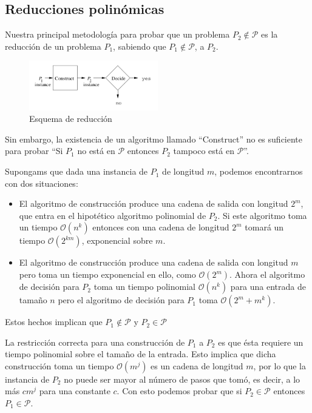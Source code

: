 \documentclass[a4paper]{article}
\begin{document}


\subsection{Reducciones polinómicas}
Nuestra principal metodología para probar que un problema $P_2 \notin \mathcal{P}$
es la reducción de un problema $P_1$, sabiendo que $P_1 \notin \mathcal{P}$, a $P_2$.

\begin{figure}[h]
\centering
\graphicspath{ {./Images/} }
\includegraphics[width=0.5\textwidth]{reduccion.png}
\caption{\label{fig:Reduccion}Esquema de reducción\cite{hopcroft2001introduction}}
\end{figure}
Sin embargo, la existencia de un algoritmo llamado ``Construct'' no es suficiente
para probar ``Si $P_1$ no está en $\mathcal{P}$ entonces $P_2$ tampoco está en $\mathcal{P}$''.

Supongams que dada una instancia de $P_1$ de longitud $m$, podemos encontrarnos
con dos situaciones:
\begin{itemize}
  \item El algoritmo de construcción produce una cadena de salida con longitud
  $2^{m}$, que entra en el hipotético algoritmo polinomial de $P_2$. Si este
  algoritmo toma un tiempo $\mathcal{O}(n^k)$ entonces con una cadena de
  longitud $2^{m}$ tomará un tiempo $\mathcal{O}(2^{km})$, exponencial sobre $m$.
  \item El algoritmo de construcción produce una cadena de salida con longitud
  $m$ pero toma un tiempo exponencial en ello, como $\mathcal{O}(2^m)$. Ahora el
  algoritmo de decisión para $P_2$ toma un tiempo polinomial $\mathcal{O}(n^k)$
  para una entrada de tamaño $n$ pero el algoritmo de decisión para $P_1$ toma
  $\mathcal{O}(2^{m} + m^{k})$.
\end{itemize}
Estos hechos implican que $P_1 \notin \mathcal{P}$ y $P_2 \in \mathcal{P}$

La restricción correcta para una construcción de $P_1$ a $P_2$ es que  ésta requiere
un tiempo polinomial sobre el tamaño de la entrada.
Esto implica que dicha construcción toma un tiempo $\mathcal{O}(m^{j})$ es un
cadena de longitud $m$, por lo que la instancia de $P_2$ no puede ser mayor al
número de pasos que tomó, es decir, a lo más $cm^{j}$ para una constante $c$.
Con esto podemos probar que si $P_2 \in \mathcal{P}$ entonces $P_1 \in \mathcal{P}$.
\end{document}
